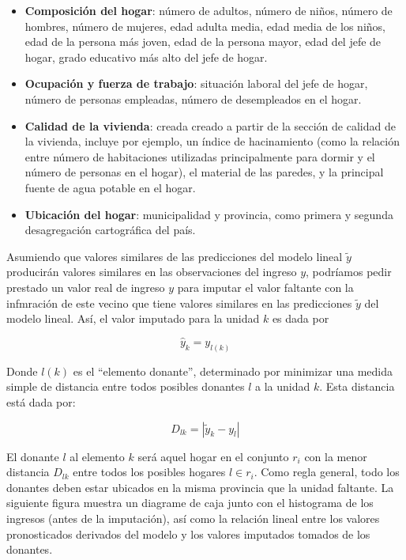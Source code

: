 \documentclass[
  10pt,
  spanish,
]{book}
\providecommand{\tightlist}{%
  \setlength{\itemsep}{0pt}\setlength{\parskip}{0pt}}
\begin{document}
\begin{itemize}
\tightlist
\item
  \textbf{Composición del hogar}: número de adultos, número de niños, número de hombres, número de mujeres, edad adulta media, edad media de los niños, edad de la persona más joven, edad de la persona mayor, edad del jefe de hogar, grado educativo más alto del jefe de hogar.
\item
  \textbf{Ocupación y fuerza de trabajo}: situación laboral del jefe de hogar, número de personas empleadas, número de desempleados en el hogar.
\item
  \textbf{Calidad de la vivienda}: creada creado a partir de la sección de calidad de la vivienda, incluye por ejemplo, un índice de hacinamiento (como la relación entre número de habitaciones utilizadas principalmente para dormir y el número de personas en el hogar), el material de las paredes, y la principal fuente de agua potable en el hogar.
\item
  \textbf{Ubicación del hogar}: municipalidad y provincia, como primera y segunda desagregación cartográfica del país.
\end{itemize}

Asumiendo que valores similares de las predicciones del modelo lineal \(\tilde y\) producirán valores similares en las observaciones del ingreso \(y\), podríamos pedir prestado un valor real de ingreso \(y\) para imputar el valor faltante con la infmración de este vecino que tiene valores similares en las predicciones \(\tilde y\) del modelo lineal. Así, el valor imputado para la unidad \(k\) es dada por

\[\hat{y}_k = y_{l(k)}\]

Donde \(l(k)\) es el ``elemento donante'', determinado por minimizar una medida simple de distancia entre todos posibles donantes \(l\) a la unidad \(k\). Esta distancia está dada por:

\[
D_{lk} = |\tilde y_k - y_l|
\]

El donante \(l\) al elemento \(k\) será aquel hogar en el conjunto \(r_i\) con la menor distancia \(D_{lk}\) entre todos los posibles hogares \(l\in r_i\). Como regla general, todo los donantes deben estar ubicados en la misma provincia que la unidad faltante. La siguiente figura muestra un diagrame de caja junto con el histograma de los ingresos (antes de la imputación), así como la relación lineal entre los valores pronosticados derivados del modelo y los valores imputados tomados de los donantes.
\end{document}
